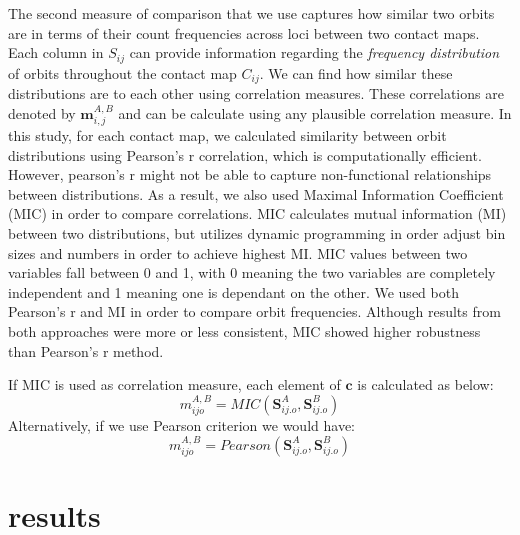 \documentclass[a4,center,fleqn]{NAR}
\begin{document}
The second measure of comparison that we use captures how 
similar two orbits are in terms of their count 
frequencies across loci between two contact maps. 
Each column in $S_{ij}$ can provide information
regarding the \textit{frequency distribution} of orbits throughout
the contact map $C_{ij}$. 
We can find how similar these distributions are to each other using
correlation measures.
These correlations are denoted by $\mathbf{m}^{A,B}_{i,j}$ and
can be calculate using
any plausible correlation measure. 
In this study, for each contact map,  we calculated
similarity between orbit distributions using Pearson's r 
correlation, which is computationally efficient.
However, pearson's r might not be able to capture
non-functional relationships between distributions. As a result, we
also used Maximal Information Coefficient (MIC) 
\cite{reshef2011detecting} in order to compare
correlations. MIC calculates mutual information (MI) between two
distributions, but utilizes dynamic programming in order adjust
bin sizes and numbers in order to achieve highest MI.
MIC values between two variables fall between 0 and 1,
with 0 meaning the two variables are completely independent
and 1 meaning one is dependant on the other.
We used both Pearson's r and MI in order to compare orbit
frequencies. Although results from both approaches were more
or less consistent, MIC showed higher robustness than Pearson's 
r method.

If MIC is used as correlation measure, each element of 
 $\mathbf{c}$ is calculated as below:
\begin{equation}
    m^{A,B}_{ijo} = MIC(\mathbf{S}^A_{ij.o}, \mathbf{S}^B_{ij.o})
    \label{eq:mic}
\end{equation}
Alternatively, if we use Pearson criterion we would have:
\begin{equation}
    m^{A,B}_{ijo} = Pearson(\mathbf{S}^A_{ij.o}, \mathbf{S}^B_{ij.o})
    \label{eq:pearson}
\end{equation}

\section{results}
\end{document}
